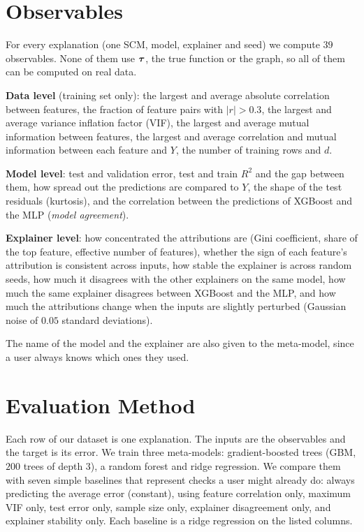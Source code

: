 \section{Observables}
For every explanation (one SCM, model, explainer and seed) we compute $39$ observables. None of them use $\boldsymbol{\tau}$, the true function or the graph, so all of them can be computed on real data.

\textbf{Data level} (training set only): the largest and average absolute correlation between features, the fraction of feature pairs with $|r|>0.3$, the largest and average variance inflation factor (VIF), the largest and average mutual information between features, the largest and average correlation and mutual information between each feature and $Y$, the number of training rows and $d$.

\textbf{Model level}: test and validation error, test and train $R^2$ and the gap between them, how spread out the predictions are compared to $Y$, the shape of the test residuals (kurtosis), and the correlation between the predictions of XGBoost and the MLP (\emph{model agreement}).

\textbf{Explainer level}: how concentrated the attributions are (Gini coefficient, share of the top feature, effective number of features), whether the sign of each feature's attribution is consistent across inputs, how stable the explainer is across random seeds, how much it disagrees with the other explainers on the same model, how much the same explainer disagrees between XGBoost and the MLP, and how much the attributions change when the inputs are slightly perturbed (Gaussian noise of $0.05$ standard deviations).

The name of the model and the explainer are also given to the meta-model, since a user always knows which ones they used.

\section{Evaluation Method}
Each row of our dataset is one explanation. The inputs are the observables and the target is its error. We train three meta-models: gradient-boosted trees (GBM, $200$ trees of depth $3$), a random forest and ridge regression. We compare them with seven simple baselines that represent checks a user might already do: always predicting the average error (constant), using feature correlation only, maximum VIF only, test error only, sample size only, explainer disagreement only, and explainer stability only. Each baseline is a ridge regression on the listed columns.

